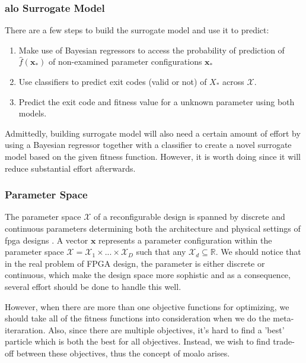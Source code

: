 \documentclass[11pt, runningheads,a4paper]{llncs}
\begin{document}
\subsubsection{\ac{alo} Surrogate Model}
\label{surrogatemodels}
There are a few steps to build the surrogate model and use it to predict:
\begin{enumerate}\addtolength{\itemsep}{-0.1\baselineskip}  
\item Make use of Bayesian regressors to access the probability of prediction of $\hat{f}(\mathbf{x_*})$ of non-examined parameter configurations $\mathbf{x_*}$
\item Use classifiers to predict exit codes (valid or not) of $X_*$ across $\mathcal{X}$.
\item Predict the exit code and fitness value for a unknown parameter using both models.
\end{enumerate}

Admittedly, building surrogate model will also need a certain amount of effort by using a Bayesian regressor together with a classifier to create a novel surrogate model based on the given fitness function. However, it is worth doing since it will reduce substantial effort afterwards.

\subsubsection{Parameter Space} 
\label{designspace}
The parameter space $\mathcal{X}$ of a reconfigurable design is spanned by discrete and continuous parameters determining both the architecture and physical settings of \ac{fpga} designs \cite{arc2012MLO}. A vector $\mathbf{x}$ represents a parameter configuration within the parameter space $\mathcal{X} = \mathcal{X}_1 \times ... \times \mathcal{X}_D $ such that any $\mathcal{X}_{d} \subseteq \mathbb{R}$. We should notice that in the real problem of FPGA design, the parameter is either discrete or continuous, which make the design space more sophistic and as a consequence, several effort should be done to handle this well.


%

However, when there are more than one objective functions for optimizing, we should take all of the fitness functions into consideration when we do the meta-iteraration. Also, since there are multiple objectives, it's hard to find a 'best' particle which is both the best for all objectives. Instead, we wish to find trade-off between these objectives, thus the concept of \ac{moalo} arises. 
\end{document}
